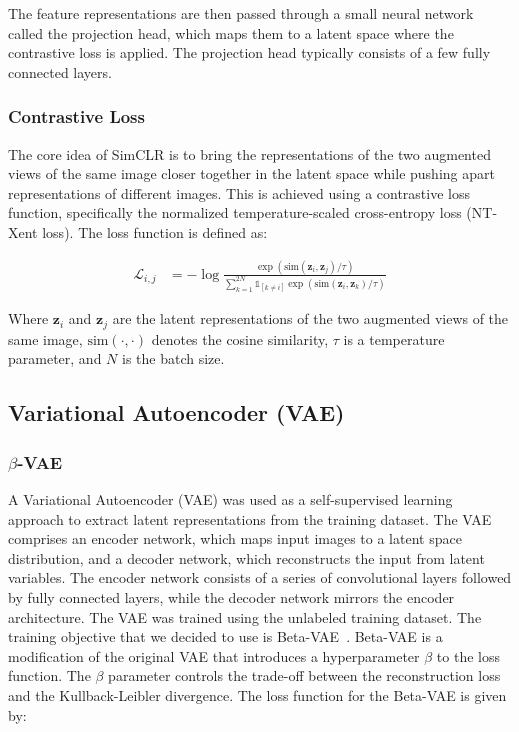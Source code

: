 \documentclass{article}
\begin{document}
The feature representations are then passed through a small neural network
called the projection head, which maps them to a latent space where the
contrastive loss is applied. The projection head typically consists of a few
fully connected layers.

\subsubsection{Contrastive Loss}
The core idea of SimCLR is to bring the representations of the two augmented
views of the same image closer together in the latent space while pushing apart
representations of different images. This is achieved using a contrastive loss
function, specifically the normalized temperature-scaled cross-entropy loss
(NT-Xent loss). The loss function is defined as:

\begin{align}
  \mathcal{L}_{i,j} & = -\log
  \frac{\exp(\text{sim}(\mathbf{z}_i, \mathbf{z}_j) / \tau)}{\sum_{k=1}^{2N}
  \mathbb{1}_{[k \neq i]} \exp(\text{sim}(\mathbf{z}_i, \mathbf{z}_k) / \tau)}
  \label{eq:simclr}
\end{align}

Where $\mathbf{z}_i$ and $\mathbf{z}_j$ are the latent representations of the
two augmented views of the same image, $\text{sim}(\cdot, \cdot)$ denotes the
cosine similarity, $\tau$ is a temperature parameter, and $N$ is the batch
size.

\subsection{Variational Autoencoder (VAE)}

\subsubsection{$\beta$-VAE}
A Variational Autoencoder (VAE) was used as a self-supervised learning approach
to extract latent representations from the training dataset. The VAE comprises
an encoder network, which maps input images to a latent space distribution, and
a decoder network, which reconstructs the input from latent variables. The
encoder network consists of a series of convolutional layers followed by fully
connected layers, while the decoder network mirrors the encoder architecture.
The VAE was trained using the unlabeled training dataset. The training
objective that we decided to use is Beta-VAE~\cite{beta-vae}. Beta-VAE is a
modification of the original VAE that introduces a hyperparameter $\beta$ to
the loss function. The $\beta$ parameter controls the trade-off between the
reconstruction loss and the Kullback-Leibler divergence. The loss function for
the Beta-VAE is given by:
\end{document}
